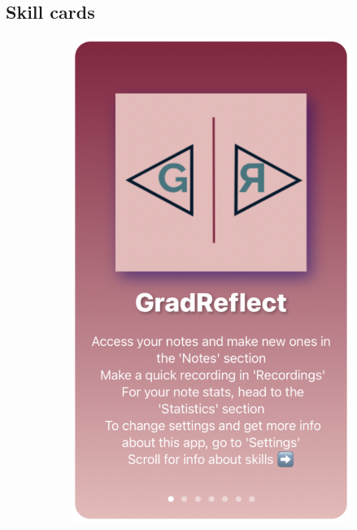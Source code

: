 \documentclass{l4proj}
\begin{document}
\begin{appendices}
%

\section{Skill cards}\label{Appendix-SkillCards}

\begin{figure}[H]
    \centering
    \begin{subfigure}[b]{0.3\textwidth}
        \includegraphics[scale=0.25]{images/HomeCard.pdf}

\end{subfigure}
\end{figure}
\end{appendices}
\end{document}
